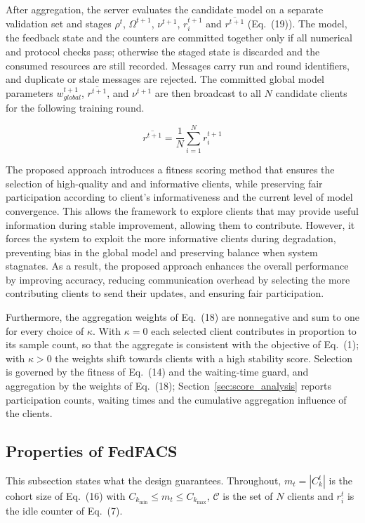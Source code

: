 \documentclass[pdflatex,sn-mathphys-num,oneside]{sn-jnl}%
\theoremstyle{thmstyleone}%
\theoremstyle{thmstyletwo}%
\theoremstyle{thmstylethree}%
\begin{document}
After aggregation, the server evaluates the candidate model on a separate validation set and stages $\rho^t$, $\Omega^{t+1}$, $\nu^{t+1}$, $r_i^{t+1}$ and $\overline{r^{t+1}}$ (Eq.~(19)). The model, the feedback state and the counters are committed together only if all numerical and protocol checks pass; otherwise the staged state is discarded and the consumed resources are still recorded. Messages carry run and round identifiers, and duplicate or stale messages are rejected. The committed global model parameters $w_{{global}}^{t+1}$, $\overline{r^{t+1}}$, and $\nu^{t+1}$ are then broadcast to all $N$ candidate clients for the following training round.

\begin{equation}
\overline{r^{t+1}} = \frac{1}{N} \sum_{i=1}^{N} r_i^{t+1}
\label{eq:avg_idle_correct}
\end{equation}

The proposed approach introduces a fitness scoring method that ensures the selection of high-quality and and informative clients, while preserving fair participation according to client’s informativeness and the current level of model convergence. This allows the framework to explore clients that may provide useful information during stable improvement, allowing them to contribute. However, it forces the system to exploit the more informative clients during degradation, preventing bias in the global model and preserving balance when system stagnates. As a result, the proposed approach enhances the overall performance by improving accuracy, reducing communication overhead by selecting the more contributing clients to send their updates, and ensuring fair participation. 

Furthermore, the aggregation weights of Eq.~(18) are nonnegative and sum to one for every choice of $\kappa$. With $\kappa=0$ each selected client contributes in proportion to its sample count, so that the aggregate is consistent with the objective of Eq.~(1); with $\kappa>0$ the weights shift towards clients with a high stability score. Selection is governed by the fitness of Eq.~(14) and the waiting-time guard, and aggregation by the weights of Eq.~(18); Section~\ref{sec:score_analysis} reports participation counts, waiting times and the cumulative aggregation influence of the clients.

\subsection{Properties of FedFACS}\label{sec:properties}
This subsection states what the design guarantees. Throughout, $m_t=|C_k^t|$ is the cohort size of Eq.~(16) with $C_{k_{\min}}\le m_t\le C_{k_{\max}}$, $\mathcal{C}$ is the set of $N$ clients and $r_i^t$ is the idle counter of Eq.~(7).
\end{document}

